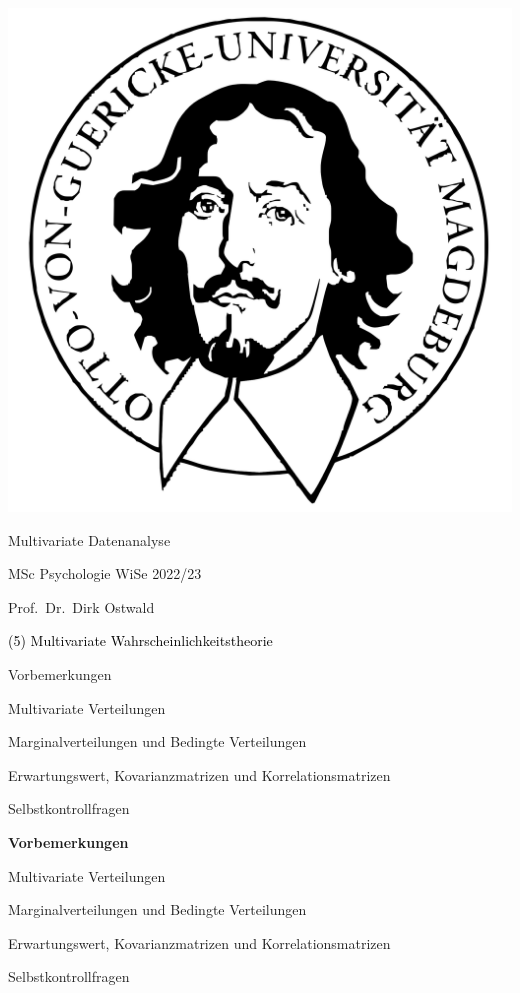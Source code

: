\documentclass[
  8pt,
  ignorenonframetext,
]{beamer}
\author{}
\date{\vspace{-2.5em}}
\begin{document}
\begin{frame}[plain]{}
\protect\hypertarget{section}{}
\center

\begin{center}\includegraphics[width=0.2\linewidth]{5_Abbildungen/mvda_5_otto} \end{center}

\vspace{2mm}

\Huge

Multivariate Datenanalyse \vspace{6mm}

\large

MSc Psychologie WiSe 2022/23

\vspace{6mm}
\large

Prof.~Dr.~Dirk Ostwald
\end{frame}

\begin{frame}[plain]{}
\protect\hypertarget{section-1}{}
\vfill
\center
\huge

\textcolor{black}{(5) Multivariate Wahrscheinlichkeitstheorie} \vfill
\end{frame}

\begin{frame}{}
\protect\hypertarget{section-2}{}
\large
{}
\vfill

Vorbemerkungen

Multivariate Verteilungen

Marginalverteilungen und Bedingte Verteilungen

Erwartungswert, Kovarianzmatrizen und Korrelationsmatrizen

Selbstkontrollfragen \vfill
\end{frame}

\begin{frame}{}
\protect\hypertarget{section-3}{}
\large
{}
\vfill

\textbf{Vorbemerkungen}

Multivariate Verteilungen

Marginalverteilungen und Bedingte Verteilungen

Erwartungswert, Kovarianzmatrizen und Korrelationsmatrizen

Selbstkontrollfragen \vfill
\end{frame}
\end{document}

